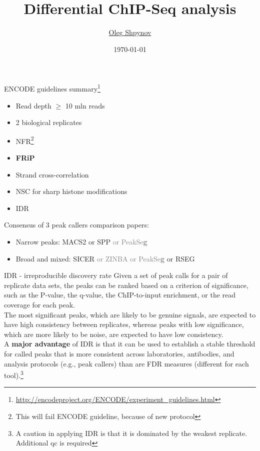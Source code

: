 \documentclass{beamer}
\title{Differential ChIP-Seq analysis}
\author{\href{mailto:os@jetbrains.com}{Oleg Shpynov}}
\institute{JetBrains Biolabs}
\date{\today}
\begin{document}
\begin{frame}
  \titlepage
\end{frame}

\begin{frame}{ENCODE guidelines summary\footnote{\url{http://encodeproject.org/ENCODE/experiment_guidelines.html}}}
\begin{itemize}
\item Read depth $\geq$ 10 mln reads
\item 2 biological replicates
\item NFR\footnote{This will fail ENCODE guideline, because of new protocol}
\item \textbf{FRiP}
\item Strand cross-correlation
\item NSC for sharp histone modifications 
\item IDR
\end{itemize}
Consensus of 3 peak callers comparison papers:
\begin{itemize}
\item Narrow peaks: MACS2 or SPP \textcolor{gray}{or PeakSe\textbf{g}}
\item Broad and mixed: SICER \textcolor{gray}{or ZINBA or PeakSe\textbf{g}} or RSEG
\end{itemize}
\end{frame}

\begin{frame}{IDR - irreproducible discovery rate}
Given a set of peak calls for a pair of replicate data sets, the peaks can be ranked based on a criterion of significance, such as the P-value, the q-value, the ChIP-to-input enrichment, or the read coverage for each peak.\\
The most significant peaks, which are likely to be genuine signals, are expected to have high consistency between replicates, whereas peaks with low significance, which are more likely to be noise, are expected to have low consistency.\\
A \textbf{major advantage} of IDR is that it can be used to establish a stable threshold for called peaks that is more consistent across laboratories, antibodies, and analysis protocols (e.g., peak callers) than are FDR measures (different for each tool).\footnote{A caution in applying IDR is that it is dominated by the weakest replicate. Additional qc is required}
\end{frame}
\end{document}
